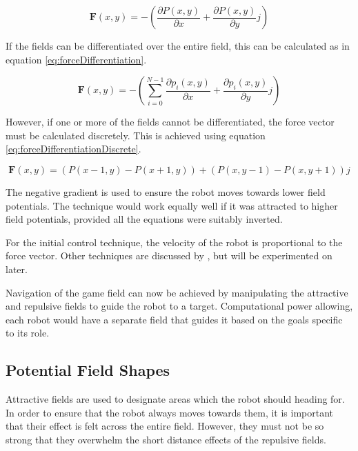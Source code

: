 \documentclass[10pt]{article} \usepackage[a4paper]{geometry}
\begin{document}
\begin{equation}
\boldsymbol{F}(x,y)=-\left(\frac{{\partial P\left(x,y\right)}}{\partial x}+\frac{{\partial P\left(x,y\right)}}{\partial y}j\right)\label{eq:forceSummation}
\end{equation}

If the fields can be differentiated over the entire field, this can be
calculated as in equation \ref{eq:forceDifferentiation}.

\begin{equation}
\boldsymbol{F}(x,y)=-\left(\sum_{i=0}^{N-1}\frac{\partial p_{i}\left(x,y\right)}{\partial x}+\frac{\partial p_{i}\left(x,y\right)}{\partial y}j\right)
\label{eq:forceDifferentiation}
\end{equation}

However, if one or more of the fields cannot be differentiated, the force vector
must be calculated discretely. This is achieved using equation
\ref{eq:forceDifferentiationDiscrete}.

\begin{equation}
\boldsymbol{F}(x,y)=\left(P\left(x-1,y\right)-P\left(x+1,y\right)\right)+\left(P\left(x,y-1\right)-P\left(x,y+1\right)\right)j
\label{eq:forceDifferentiationDiscrete}
\end{equation}

The negative gradient is used to ensure the robot moves towards lower field
potentials. The technique would work equally well if it was attracted to higher
field potentials, provided all the equations were suitably inverted.

For the initial control technique, the velocity of the robot is proportional to
the force vector. Other techniques are discussed by
\cite{intelligentAlgorithmPathPlanning}, but will be experimented on later.

Navigation of the game field can now be achieved by manipulating the attractive
and repulsive fields to guide the robot to a target. Computational power
allowing, each robot would have a separate field that guides it based on the
goals specific to its role.

\subsection{Potential Field Shapes}

Attractive fields are used to designate areas which the robot should heading
for. In order to ensure that the robot always moves towards them, it is
important that their effect is felt across the entire field. However, they must
not be so strong that they overwhelm the short distance effects of the repulsive
fields.
\end{document}
